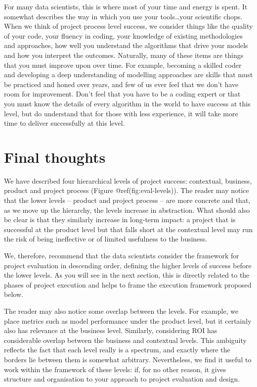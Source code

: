 \documentclass[]{book}
\begin{document}
For many data scientists, this is where most of your time and energy is
spent. It somewhat describes the way in which you use your
tools\ldots{}your scientific chops. When we think of project process
level success, we consider things like the quality of your code, your
fluency in coding, your knowledge of existing methodologies and
approaches, how well you understand the algorithms that drive your
models and how you interpret the outcomes. Naturally, many of these
items are things that you must improve upon over time. For example,
becoming a skilled coder and developing a deep understanding of
modelling approaches are skills that must be practiced and honed over
years, and few of us ever feel that we don't have room for improvement.
Don't feel that you have to be a coding expert or that you must know the
details of every algorithm in the world to have success at this level,
but do understand that for those with less experience, it will take more
time to deliver successfully at this level.

\hypertarget{final-thoughts}{%
\section{Final thoughts}\label{final-thoughts}}

We have described four hierarchical levels of project success:
contextual, business, product and project process (Figure
@ref(fig:eval-levels)). The reader may notice that the lower levels --
product and project process -- are more concrete and that, as we move up
the hierarchy, the levels increase in abstraction. What should also be
clear is that they similarly increase in long-term impact: a project
that is successful at the product level but that falls short at the
contextual level may run the risk of being ineffective or of limited
usefulness to the business.

We, therefore, recommend that the data scientists consider the framework
for project evaluation in descending order, defining the higher levels
of success before the lower levels. As you will see in the next section,
this is directly related to the phases of project execution and helps to
frame the execution framework proposed below.

The reader may also notice some overlap between the levels. For example,
we place metrics such as model performance under the product level, but
it certainly also has relevance at the business level. Similarly,
considering ROI has considerable overlap between the business and
contextual levels. This ambiguity reflects the fact that each level
really is a spectrum, and exactly where the borders lie between them is
somewhat arbitrary. Nevertheless, we find it useful to work within the
framework of these levels: if, for no other reason, it gives structure
and organisation to your approach to project evaluation and design.
\end{document}
